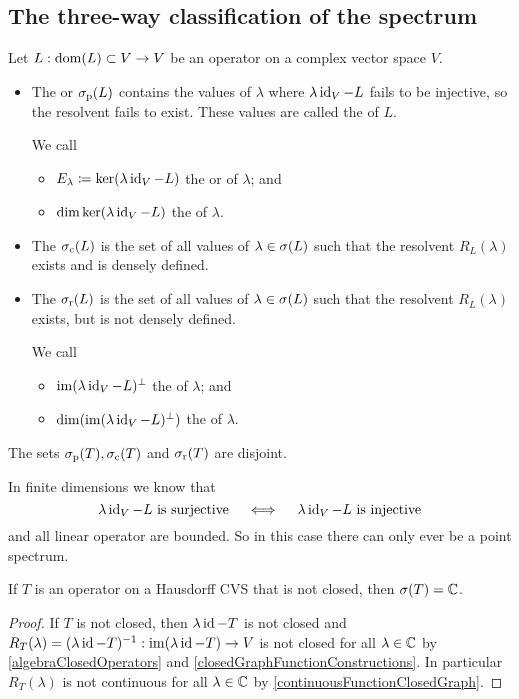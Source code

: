 \subsection{The three-way classification of the spectrum}
\begin{definition}
Let $L: \operatorname{dom}(L)\subset V \to V$ be an operator on a complex vector space $V$.

\begin{itemize}
\item The  or  $\sigma_\text{p}(L)$ contains the values of $\lambda$ where $\lambda \operatorname{id}_V - L$ fails to be injective, so the resolvent fails to exist. These values are called the  of $L$.

We call
\begin{itemize}
\item $E_\lambda \coloneqq \ker(\lambda \operatorname{id}_V - L)$ the  or  of $\lambda$; and
\item $\dim\ker(\lambda \operatorname{id}_V - L)$ the  of $\lambda$.
\end{itemize}
\item The  $\sigma_\text{c}(L)$ is the set of all values of $\lambda\in\sigma(L)$ such that the resolvent $R_L(\lambda)$ exists and is densely defined.
\item The  $\sigma_\text{r}(L)$ is the set of all values of $\lambda\in\sigma(L)$ such that the resolvent $R_L(\lambda)$ exists, but is not densely defined.

We call
\begin{itemize}
\item $\operatorname{im}(\lambda \operatorname{id}_V - L)^\perp$ the  of $\lambda$; and 
\item $\dim(\operatorname{im}(\lambda \operatorname{id}_V - L)^\perp)$ the  of $\lambda$.
\end{itemize}
\end{itemize}
The sets $\sigma_\text{p}(T), \sigma_\text{c}(T)$ and $\sigma_\text{r}(T)$ are disjoint.
\end{definition}
In finite dimensions we know that
\[ \text{$\lambda \operatorname{id}_V - L$ is surjective} \quad\iff\quad \text{$\lambda \operatorname{id}_V - L$ is injective} \]
and all linear operator are bounded.
So in this case there can only ever be a point spectrum.

\begin{proposition} \label{spectrumNonClosedOperator}
If $T$ is an operator on a Hausdorff CVS that is not closed, then $\sigma(T) = \mathbb{C}$.
\end{proposition}
\begin{proof}
If $T$ is not closed, then $\lambda\operatorname{id} - T$ is not closed and $R_T(\lambda) = (\lambda\operatorname{id} - T)^{-1}: \operatorname{im}(\lambda\operatorname{id} - T) \to V$ is not closed for all $\lambda\in \mathbb{C}$ by \ref{algebraClosedOperators} and \ref{closedGraphFunctionConstructions}. In particular $R_T(\lambda)$ is not continuous for all $\lambda\in \mathbb{C}$ by \ref{continuousFunctionClosedGraph}.
\end{proof}

